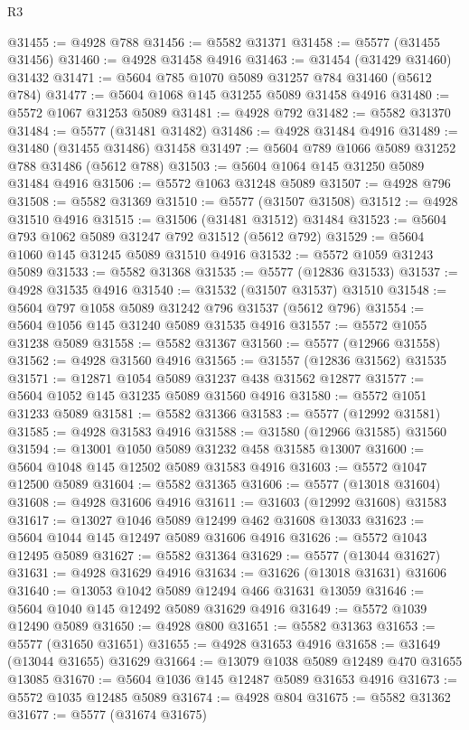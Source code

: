 \begin{lexlean}{R3}
\begin{coremodule}
@31455 := @4928 @788
@31456 := @5582 @31371
@31458 := @5577 (@31455 @31456)
@31460 := @4928 @31458 @4916
@31463 := @31454 (@31429 @31460) @31432
@31471 := @5604 @785 @1070 @5089 @31257 @784 @31460 (@5612 @784)
@31477 := @5604 @1068 @145 @31255 @5089 @31458 @4916
@31480 := @5572 @1067 @31253 @5089
@31481 := @4928 @792
@31482 := @5582 @31370
@31484 := @5577 (@31481 @31482)
@31486 := @4928 @31484 @4916
@31489 := @31480 (@31455 @31486) @31458
@31497 := @5604 @789 @1066 @5089 @31252 @788 @31486 (@5612 @788)
@31503 := @5604 @1064 @145 @31250 @5089 @31484 @4916
@31506 := @5572 @1063 @31248 @5089
@31507 := @4928 @796
@31508 := @5582 @31369
@31510 := @5577 (@31507 @31508)
@31512 := @4928 @31510 @4916
@31515 := @31506 (@31481 @31512) @31484
@31523 := @5604 @793 @1062 @5089 @31247 @792 @31512 (@5612 @792)
@31529 := @5604 @1060 @145 @31245 @5089 @31510 @4916
@31532 := @5572 @1059 @31243 @5089
@31533 := @5582 @31368
@31535 := @5577 (@12836 @31533)
@31537 := @4928 @31535 @4916
@31540 := @31532 (@31507 @31537) @31510
@31548 := @5604 @797 @1058 @5089 @31242 @796 @31537 (@5612 @796)
@31554 := @5604 @1056 @145 @31240 @5089 @31535 @4916
@31557 := @5572 @1055 @31238 @5089
@31558 := @5582 @31367
@31560 := @5577 (@12966 @31558)
@31562 := @4928 @31560 @4916
@31565 := @31557 (@12836 @31562) @31535
@31571 := @12871 @1054 @5089 @31237 @438 @31562 @12877
@31577 := @5604 @1052 @145 @31235 @5089 @31560 @4916
@31580 := @5572 @1051 @31233 @5089
@31581 := @5582 @31366
@31583 := @5577 (@12992 @31581)
@31585 := @4928 @31583 @4916
@31588 := @31580 (@12966 @31585) @31560
@31594 := @13001 @1050 @5089 @31232 @458 @31585 @13007
@31600 := @5604 @1048 @145 @12502 @5089 @31583 @4916
@31603 := @5572 @1047 @12500 @5089
@31604 := @5582 @31365
@31606 := @5577 (@13018 @31604)
@31608 := @4928 @31606 @4916
@31611 := @31603 (@12992 @31608) @31583
@31617 := @13027 @1046 @5089 @12499 @462 @31608 @13033
@31623 := @5604 @1044 @145 @12497 @5089 @31606 @4916
@31626 := @5572 @1043 @12495 @5089
@31627 := @5582 @31364
@31629 := @5577 (@13044 @31627)
@31631 := @4928 @31629 @4916
@31634 := @31626 (@13018 @31631) @31606
@31640 := @13053 @1042 @5089 @12494 @466 @31631 @13059
@31646 := @5604 @1040 @145 @12492 @5089 @31629 @4916
@31649 := @5572 @1039 @12490 @5089
@31650 := @4928 @800
@31651 := @5582 @31363
@31653 := @5577 (@31650 @31651)
@31655 := @4928 @31653 @4916
@31658 := @31649 (@13044 @31655) @31629
@31664 := @13079 @1038 @5089 @12489 @470 @31655 @13085
@31670 := @5604 @1036 @145 @12487 @5089 @31653 @4916
@31673 := @5572 @1035 @12485 @5089
@31674 := @4928 @804
@31675 := @5582 @31362
@31677 := @5577 (@31674 @31675)

\end{coremodule}
\end{lexlean}
